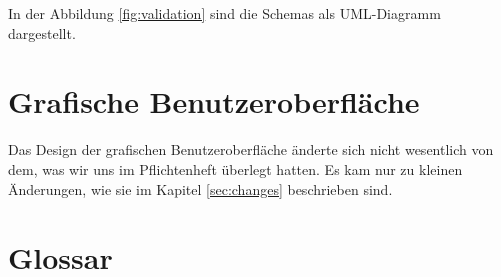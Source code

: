 \documentclass{implementierungsheft}
\begin{document}
In der Abbildung \ref{fig:validation} sind die Schemas als UML-Diagramm dargestellt.



\section{Grafische Benutzeroberfläche}
Das Design der grafischen Benutzeroberfläche änderte sich nicht wesentlich von dem, was wir uns im Pflichtenheft überlegt hatten.
Es kam nur zu kleinen Änderungen, wie sie im Kapitel \ref{sec:changes} beschrieben sind.
\newpage
\section{Glossar}
\printglossary[style=altlist]
\end{document}
